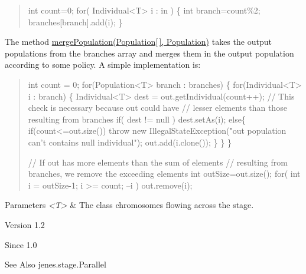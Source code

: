 \begin{quotation}

\begin{DoxyPre}        
    int count=0;    
    for( Individual<T> i : in ) \{
        int branch=count\%2;
            branches[branch].add(i);
    \}
\end{DoxyPre}
\end{quotation}
The method \hyperlink{}{merge\-Population(\-Population\mbox{[}$\,$\mbox{]}, Population)} takes the output populations from the branches array and merges them in the output population according to some policy. A simple implementation is\-: 

\begin{quotation}

\begin{DoxyPre}
    int count = 0;
    for(Population<T>  branch : branches) \{
        for(Individual<T> i : branch) \{
            Individual<T> dest = out.getIndividual(count++);
            // This check is necessary because out could have
            // lesser elements than those resulting from branches
            if( dest != null )
                dest.setAs(i);
            else\{
                if(count<=out.size())
                    throw new IllegalStateException("out population can't contains null individual");
                out.add(i.clone());
            \}
        \}
    \}\end{DoxyPre}



\begin{DoxyPre}    // If out has more elements than the sum of elements
    // resulting from branches, we remove the exceeding elements
    int outSize=out.size();
    for( int i = outSize-1; i >= count; --i )
        out.remove(i);
\end{DoxyPre}
\end{quotation}



\begin{DoxyPre}\end{DoxyPre}



\begin{DoxyPre}
\begin{DoxyParams}{Parameters}
{\em <T>} & The class chromosomes flowing across the stage.\\
\hline
\end{DoxyParams}
\begin{DoxyVersion}{Version}
1.2

\end{DoxyVersion}
\begin{DoxySince}{Since}
1.0
\end{DoxySince}
\begin{DoxySeeAlso}{See Also}
jenes.stage.Parallel

\end{DoxySeeAlso}
\end{DoxyPre}


